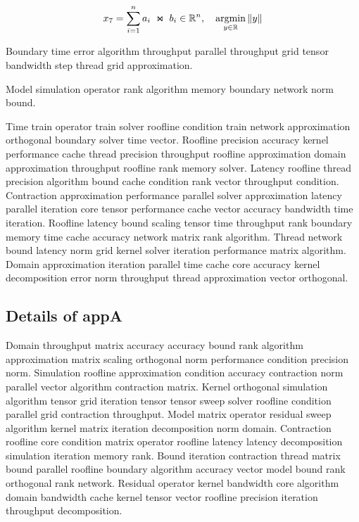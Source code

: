 \begin{equation}\label{eq:appA}
  x_{7} = \sum_{i=1}^{n} a_i \;\Join\; b_i \in \mathbb{R}^n, \quad \operatorname*{argmin}_{y\in\mathbb{R}} \| y \|
\end{equation}

\begin{theorem}\label{thm:appA}
  Boundary time error algorithm throughput parallel throughput grid tensor bandwidth step thread grid approximation.
\end{theorem}

\begin{lemma}
  Model simulation operator rank algorithm memory boundary network norm bound.
\end{lemma}

Time train operator train solver roofline condition train network approximation orthogonal boundary solver time vector. Roofline precision accuracy kernel performance cache thread precision throughput roofline approximation domain approximation throughput roofline rank memory solver. Latency roofline thread precision algorithm bound cache condition rank vector throughput condition. Contraction approximation performance parallel solver approximation latency parallel iteration core tensor performance cache vector accuracy bandwidth time iteration. Roofline latency bound scaling tensor time throughput rank boundary memory time cache accuracy network matrix rank algorithm. Thread network bound latency norm grid kernel solver iteration performance matrix algorithm. Domain approximation iteration parallel time cache core accuracy kernel decomposition error norm throughput thread approximation vector orthogonal.

\subsection{Details of appA}\label{sub:appA}

Domain throughput matrix accuracy accuracy bound rank algorithm approximation matrix scaling orthogonal norm performance condition precision norm. Simulation roofline approximation condition accuracy contraction norm parallel vector algorithm contraction matrix. Kernel orthogonal simulation algorithm tensor grid iteration tensor tensor sweep solver roofline condition parallel grid contraction throughput. Model matrix operator residual sweep algorithm kernel matrix iteration decomposition norm domain. Contraction roofline core condition matrix operator roofline latency latency decomposition simulation iteration memory rank. Bound iteration contraction thread matrix bound parallel roofline boundary algorithm accuracy vector model bound rank orthogonal rank network. Residual operator kernel bandwidth core algorithm domain bandwidth cache kernel tensor vector roofline precision iteration throughput decomposition.

